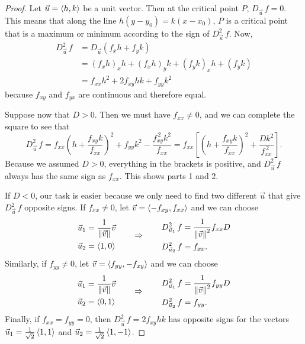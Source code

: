 \begin{proof}
Let $\vec u=\left\langle h,k\right\rangle$ be a unit vector.  Then at the critical point $P$, $D_{\vec u}\,f=0$.  This means that along the line $h(y-y_0)=k(x-x_0)$, $P$ is a critical point that is a maximum or minimum according to the sign of $D_{\vec u}^2\,f$.  Now,
\begin{align*}
 D_{\vec u}^2\,f
 &=D_{\vec u}(f_xh+f_yk)\\
 &=(f_xh)_xh+(f_xh)_yk+(f_yk)_xh+(f_yk)\\
 &=f_{xx}h^2+2f_{xy}hk+f_{yy}k^2
\end{align*}
because $f_{xy}$ and $f_{yx}$ are continuous and therefore equal.

Suppose now that $D>0$.  Then we must have $f_{xx}\neq0$, and we can complete the square to see that
\[
 D_{\vec u}^2\,f
 =f_{xx}\left(h+\frac{f_{xy}k}{f_{xx}}\right)^2
 +f_{yy}k^2-\frac{f_{xy}^{\,2}k^2}{f_{xx}}
 =f_{xx}
 \left[\left(h+\frac{f_{xy}k}{f_{xx}}\right)^2+\frac{Dk^2}{f_{xx}^{\,2}}\right].
\]
Because we assumed $D>0$, everything in the brackets is positive, and $D_{\vec u}^2\,f$ always has the same sign as $f_{xx}$.  This shows parts 1 and 2.

If $D<0$, our task is easier because we only need to find two different $\vec u$ that give $D_{\vec u}^2\,f$ opposite signs.  If $f_{xx}\neq0$, let $\vec v=\left\langle -f_{xy},f_{xx}\right\rangle$ and we can choose
\[
 \begin{aligned}
  \vec u_1&=\frac1{\left\lVert \vec v \right\rVert}\vec v \\
  \vec u_2&=\left\langle 1,0\right\rangle
 \end{aligned}
 \qquad\Rightarrow\qquad
 \begin{aligned}
   D_{\vec u_1}^2\,f&=\frac1{\left\lVert \vec v \right\rVert^2}f_{xx}D\\
   D_{\vec u_2}^2\,f&=f_{xx}.
  \end{aligned}
\]
Similarly, if $f_{yy}\neq0$, let $\vec v=\left\langle f_{yy},-f_{xy}\right\rangle$ and we can choose
\[
 \begin{aligned}
  \vec u_1&=\frac1{\left\lVert \vec v \right\rVert}\vec v \\
  \vec u_2&=\left\langle 0,1\right\rangle
 \end{aligned}
 \qquad\Rightarrow\qquad
 \begin{aligned}
   D_{\vec u_1}^2\,f&=\frac1{\left\lVert \vec v \right\rVert^2}f_{yy}D\\
   D_{\vec u_2}^2\,f&=f_{yy}.
  \end{aligned}
\]
Finally, if $f_{xx}=f_{yy}=0$, then $D_{\vec u}^2\,f=2f_{xy}hk$ has opposite signs for the vectors $\vec u_1=\frac1{\sqrt2}\left\langle 1,1\right\rangle$ and $\vec u_2=\frac1{\sqrt2}\left\langle 1,-1\right\rangle$.
\end{proof}

